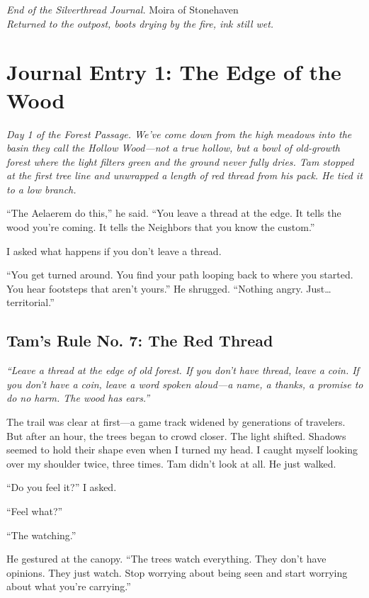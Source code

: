 \documentclass[11pt]{article}
\begin{document}
\vspace{2em}
\textit{End of the Silverthread Journal.}
\vspace{1em}
\noindent Moira of Stonehaven\\
\textit{Returned to the outpost, boots drying by the fire, ink still wet.}

\section*{Journal Entry 1: The Edge of the Wood}
\textit{Day 1 of the Forest Passage. We've come down from the high meadows into the basin they call the Hollow Wood---not a true hollow, but a bowl of old-growth forest where the light filters green and the ground never fully dries. Tam stopped at the first tree line and unwrapped a length of red thread from his pack. He tied it to a low branch.}

``The Aelaerem do this,'' he said. ``You leave a thread at the edge. It tells the wood you're coming. It tells the Neighbors that you know the custom.''

I asked what happens if you don't leave a thread.

``You get turned around. You find your path looping back to where you started. You hear footsteps that aren't yours.'' He shrugged. ``Nothing angry. Just\dots territorial.''

\subsection*{Tam's Rule No. 7: The Red Thread}
\textit{``Leave a thread at the edge of old forest. If you don't have thread, leave a coin. If you don't have a coin, leave a word spoken aloud---a name, a thanks, a promise to do no harm. The wood has ears.''}

The trail was clear at first---a game track widened by generations of travelers. But after an hour, the trees began to crowd closer. The light shifted. Shadows seemed to hold their shape even when I turned my head. I caught myself looking over my shoulder twice, three times. Tam didn't look at all. He just walked.

``Do you feel it?'' I asked.

``Feel what?''

``The watching.''

He gestured at the canopy. ``The trees watch everything. They don't have opinions. They just watch. Stop worrying about being seen and start worrying about what you're carrying.''
\end{document}
